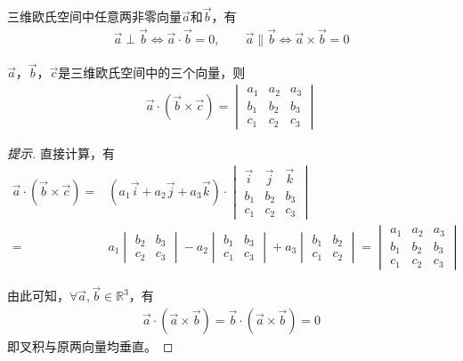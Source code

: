 \begin{theorem}三维欧氏空间中任意两非零向量$\vec a$和$\vec b$，有
  \begin{align*}
    \vec a \perp     \vec b \iff \vec a \cdot  \vec b = 0,\quad\quad
    \vec a \parallel \vec b \iff \vec a \times \vec b = 0
  \end{align*}
\end{theorem}

\begin{lemma}
  $\vec a$，$\vec b$，$\vec c$是三维欧氏空间中的三个向量，则
  \begin{align*}
    \vec a\cdot (\vec b\times \vec c) =
    \begin{vmatrix}
      a_1 & a_2 & a_3\\
      b_1 & b_2 & b_3\\
      c_1 & c_2 & c_3
    \end{vmatrix}
  \end{align*}
\end{lemma}
\begin{proof}[提示]
  直接计算，有
  \begin{align*}
    \vec a\cdot (\vec b\times \vec c) ={}& (a_1\vec i + a_2\vec j + a_3\vec k) \cdot
    \begin{vmatrix}
      \vec i & \vec j & \vec k\\
      b_1 & b_2 & b_3\\
      c_1 & c_2 & c_3
    \end{vmatrix}\\
    ={}& a_1 \begin{vmatrix} b_2 & b_3\\ c_2 & c_3  \end{vmatrix}
       - a_2 \begin{vmatrix} b_1 & b_3\\ c_1 & c_3  \end{vmatrix}
       + a_3 \begin{vmatrix} b_1 & b_2\\ c_1 & c_2  \end{vmatrix}
      =
      \begin{vmatrix}
        a_1 & a_2 & a_3\\
        b_1 & b_2 & b_3\\
        c_1 & c_2 & c_3
      \end{vmatrix}
  \end{align*}

  由此可知，$\forall \vec a, \vec b\in\mathbb{R}^3$，有
  \begin{align*}
    \vec a\cdot (\vec a\times \vec b) = \vec b\cdot(\vec a\times \vec b) = 0
  \end{align*}
  即叉积与原两向量均垂直。
\end{proof}

